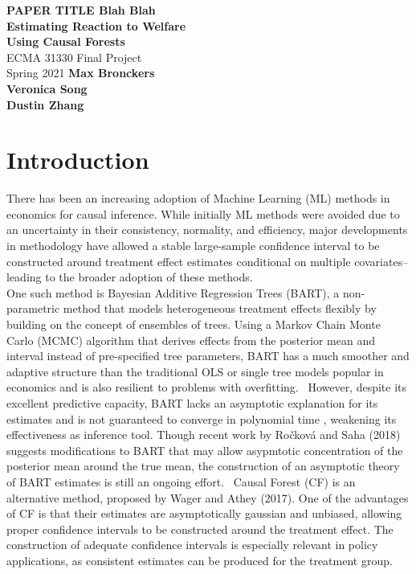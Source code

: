 \documentclass[12pt]{article}
\begin{document}
\begin{titlepage}
    \begin{center}
        \vspace*{1cm}
        \LARGE
        \textbf{PAPER TITLE Blah Blah\\ Estimating Reaction to Welfare\\ Using Causal Forests\\}
        \vspace{0.5cm}
        \Large
        ECMA 31330 Final Project \\ 
        \vspace{0.8cm}
        \large
        Spring 2021
        \vfill
        \vspace{5cm}
        \textbf{Max Bronckers \\ Veronica Song \\ Dustin Zhang}
    \end{center}
\end{titlepage}


\section{Introduction} 
There has been an increasing adoption of Machine Learning (ML) methods in
economics for causal inference. While initially ML methods were avoided due to
an uncertainty in their consistency, normality, and efficiency, major developments in
methodology have allowed a stable large-sample confidence interval to be
constructed around treatment effect estimates conditional on multiple
covariates--leading to the broader adoption of these methods.~\cite{athey2019ML} \\

One such method is Bayesian Additive Regression Trees (BART), a non-parametric
method that models heterogeneous treatment effects flexibly by building on the
concept of ensembles of trees. Using a Markov Chain Monte Carlo (MCMC) algorithm
that derives effects from the posterior mean and interval instead of
pre-specified tree parameters, BART has a much smoother and adaptive structure
than the traditional OLS or single tree models popular in economics and is also
resilient to problems with overfitting.~\cite{greenkern2012} However, despite its
excellent predictive capacity, BART lacks an asymptotic explanation for its
estimates and is not guaranteed to converge in polynomial time
\cite{atheywager2019}, weakening its effectiveness as inference tool. Though
recent work by Ročková and Saha (2018) suggests modifications to BART that may
allow asypmtotic concentration of the posterior mean around the true mean, the
construction of an asymptotic theory of BART estimates is still an ongoing
effort.~\cite{rockova2018theory} Causal Forest (CF) is an alternative method,
proposed by Wager and Athey (2017). One of the advantages of CF is that their
estimates are asymptotically gaussian and unbiased, allowing proper confidence
intervals to be constructed around the treatment effect. The construction of
adequate confidence intervals is especially relevant in policy applications, as
consistent estimates can be produced for the treatment group.~\cite{atheywager2019} \\ 
\end{document}
